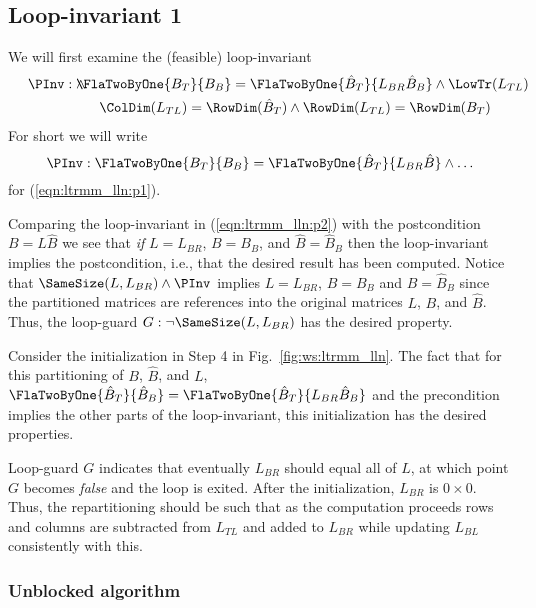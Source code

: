 \subsection{Loop-invariant 1}

We will first examine the (feasible) loop-invariant
\begin{eqnarray}
\label{eqn:ltrmm_lln:p1}
\PInv: 
\lefteqn{
\FlaTwoByOne{ B_T}{B_B} =
\FlaTwoByOne{ \hat{B}_T }
            { L_{BR} \hat{B}_B }
\wedge
\LowTr( L_{TL} ) } \wedge \\
\nonumber
& & 
\ColDim( L_{TL} ) = \RowDim( \hat{B}_T ) 
\wedge
\RowDim( L_{TL} ) = \RowDim( {B}_T ) 
\end{eqnarray}
For short we will write
\begin{equation}
\label{eqn:ltrmm_lln:p2}
\PInv: \FlaTwoByOne{ B_T}{B_B} =
\FlaTwoByOne{ \hat{B}_T }
            { L_{BR} \hat{B} }
\wedge
\ldots
\end{equation}
for (\ref{eqn:ltrmm_lln:p1}).

Comparing the loop-invariant in (\ref{eqn:ltrmm_lln:p2}) with the
postcondition $ B = L \hat{B} $ we see that {\em if} $L=L_{BR}$, $ B =
B_B $, and $ \hat{B} = \hat{B}_B $ then the loop-invariant implies the
postcondition, i.e., that the desired result has been computed.
Notice that $ \SameSize( L, L_{BR} ) \wedge \PInv $ implies $ L =
L_{BR} $, $ B = B_B $ and $ \hat{B}=\hat{B}_B $ since the partitioned
matrices are references into the original matrices $ L $, $ B $, and $
\hat{B} $.  Thus, the loop-guard $ G: \neg \SameSize( L, L_{BR} ) $
has the desired property.

Consider the initialization in Step 4 in Fig.~\ref{fig:ws:ltrmm_lln}.
The fact that for this partitioning of $ B $, $ \hat{B} $, and $ L $,
$
\FlaTwoByOne{ \hat{B}_T}
            { \hat{B}_B} =
\FlaTwoByOne{ \hat{B}_T}
            { L_{BR} \hat{B}_B } $ and the precondition implies the
other parts of the loop-invariant, this initialization has the desired
properties.

Loop-guard $ G $ indicates that eventually $ L_{BR} $ should equal all
of $ L $, at which point $ G $ becomes {\em false} and the loop is
exited.  After the initialization, $ L_{BR} $ is $ 0 \times 0 $.
Thus, the repartitioning should be such that as the computation
proceeds rows and columns are subtracted from $ L_{TL} $ and added to
$ L_{BR} $ while updating $ L_{BL} $ consistently with this.

\subsubsection{Unblocked algorithm}


